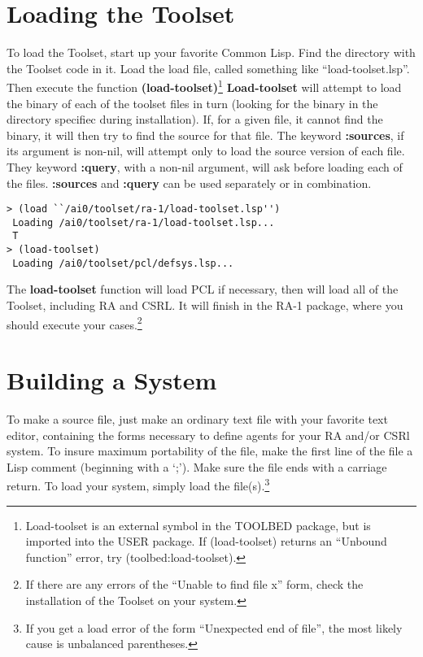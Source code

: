 \section{Loading the Toolset}

To load the Toolset, start up your favorite Common Lisp. Find the
directory with the Toolset code in it. Load the load file, called
something like ``load-toolset.lsp''.  Then execute the function {\bf
(load-toolset)}\footnote{Load-toolset is an external symbol in the
TOOLBED package, but is imported into the USER package. If
(load-toolset) returns an ``Unbound function'' error, try
(toolbed:load-toolset).} {\bf Load-toolset} will attempt to load the
binary of each of the toolset files in turn (looking for the binary in
the directory specifiec during installation). If, for a given file, it
cannot find the binary, it will then try to find the source for that
file. The keyword {\bf :sources}, if its argument is non-nil, will
attempt only to load the source version of each file. They keyword
{\bf :query}, with a non-nil argument, will ask before loading each of
the files. {\bf :sources} and {\bf :query} can be used separately or
in combination.

\begin{verbatim}
> (load ``/ai0/toolset/ra-1/load-toolset.lsp'')
 Loading /ai0/toolset/ra-1/load-toolset.lsp...
 T
> (load-toolset)
 Loading /ai0/toolset/pcl/defsys.lsp...

\end{verbatim}

The {\bf load-toolset} function will load PCL if necessary, then will load
all of the Toolset, including RA and CSRL. It will finish in the
RA-1 package, where you should execute your cases.\footnote{If there
are any errors of the ``Unable to find file x'' form, check
the installation of the Toolset on your system.}

\section{Building a System}

To make a source file, just make an ordinary text file with your
favorite text editor, containing the forms necessary to define
agents for your RA and/or CSRl system. To insure maximum portability
of the file, make the first line of the file a Lisp comment (beginning
with a `;'). Make sure the file ends with a carriage return.
To load your system, simply load the file(s).\footnote{If you get a
load error of the form ``Unexpected end of file'', the most likely
cause is unbalanced parentheses.}

